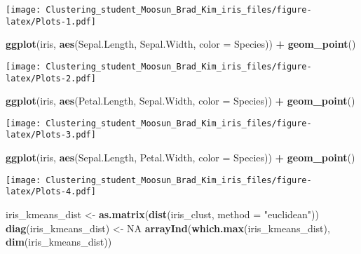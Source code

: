 \documentclass[11pt,]{article}
\newenvironment{Shaded}{\begin{snugshade}}{\end{snugshade}}
\newcommand{\DataTypeTok}[1]{\textcolor[rgb]{0.13,0.29,0.53}{#1}}
\newcommand{\KeywordTok}[1]{\textcolor[rgb]{0.13,0.29,0.53}{\textbf{#1}}}
\newcommand{\NormalTok}[1]{#1}
\newcommand{\OperatorTok}[1]{\textcolor[rgb]{0.81,0.36,0.00}{\textbf{#1}}}
\newcommand{\OtherTok}[1]{\textcolor[rgb]{0.56,0.35,0.01}{#1}}
\newcommand{\StringTok}[1]{\textcolor[rgb]{0.31,0.60,0.02}{#1}}
\begin{document}
\texttt{[image: Clustering\_student\_Moosun\_Brad\_Kim\_iris\_files/figure-latex/Plots-1.pdf]}

\begin{Shaded}
\begin{Highlighting}[]
\KeywordTok{ggplot}\NormalTok{(iris, }\KeywordTok{aes}\NormalTok{(Sepal.Length, Sepal.Width, }\DataTypeTok{color =}\NormalTok{ Species)) }\OperatorTok{+}\StringTok{ }\KeywordTok{geom_point}\NormalTok{()}
\end{Highlighting}
\end{Shaded}

\texttt{[image: Clustering\_student\_Moosun\_Brad\_Kim\_iris\_files/figure-latex/Plots-2.pdf]}

\begin{Shaded}
\begin{Highlighting}[]
\KeywordTok{ggplot}\NormalTok{(iris, }\KeywordTok{aes}\NormalTok{(Petal.Length, Sepal.Width, }\DataTypeTok{color =}\NormalTok{ Species)) }\OperatorTok{+}\StringTok{ }\KeywordTok{geom_point}\NormalTok{()}
\end{Highlighting}
\end{Shaded}

\texttt{[image: Clustering\_student\_Moosun\_Brad\_Kim\_iris\_files/figure-latex/Plots-3.pdf]}

\begin{Shaded}
\begin{Highlighting}[]
\KeywordTok{ggplot}\NormalTok{(iris, }\KeywordTok{aes}\NormalTok{(Sepal.Length, Petal.Width, }\DataTypeTok{color =}\NormalTok{ Species)) }\OperatorTok{+}\StringTok{ }\KeywordTok{geom_point}\NormalTok{()}
\end{Highlighting}
\end{Shaded}

\texttt{[image: Clustering\_student\_Moosun\_Brad\_Kim\_iris\_files/figure-latex/Plots-4.pdf]}

\begin{Shaded}
\begin{Highlighting}[]
\NormalTok{iris_kmeans_dist <-}\StringTok{ }\KeywordTok{as.matrix}\NormalTok{(}\KeywordTok{dist}\NormalTok{(iris_clust, }\DataTypeTok{method =} \StringTok{"euclidean"}\NormalTok{))}
\KeywordTok{diag}\NormalTok{(iris_kmeans_dist) <-}\StringTok{ }\OtherTok{NA}
\KeywordTok{arrayInd}\NormalTok{(}\KeywordTok{which.max}\NormalTok{(iris_kmeans_dist), }\KeywordTok{dim}\NormalTok{(iris_kmeans_dist))}
\end{Highlighting}
\end{Shaded}
\end{document}
